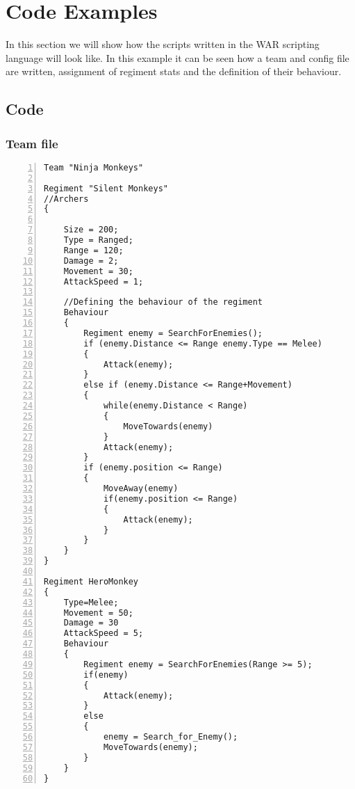 \section{Code Examples}
	In this section we will show how the scripts written in the WAR scripting language will look like.
	In this example it can be seen how a team and config file are written, assignment of regiment stats and the definition of their behaviour.
	\subsection{Code}
		\subsubsection{Team file}
					\begin{lstlisting}[basicstyle=\small\sffamily,
					keywords={break,case,const,continue,default,else,enum,
					for,if,return,switch,while,do,long,void,int,float,double,
					char,struct,typedef,include,size\_t},
					keywordstyle={\color{blue}},
					comment={[l]{//}}, morecomment={[s]{/*}{*/}}, commentstyle=\itshape,
					columns={[l]flexible}, numbers=left, numberstyle=\tiny,
					frameround=fftt, frame=shadowbox, captionpos=b,
					caption={Team file},
					label=LST:code31]
Team "Ninja Monkeys"

Regiment "Silent Monkeys"
//Archers
{
	
	Size = 200;
	Type = Ranged;
	Range = 120;
	Damage = 2;
	Movement = 30;
	AttackSpeed = 1;
	
	//Defining the behaviour of the regiment
	Behaviour
	{
		Regiment enemy = SearchForEnemies();
		if (enemy.Distance <= Range enemy.Type == Melee)
		{
			Attack(enemy);
		}
		else if (enemy.Distance <= Range+Movement)
		{
			while(enemy.Distance < Range)
			{
				MoveTowards(enemy)
			}
			Attack(enemy);
		}
		if (enemy.position <= Range)
		{
			MoveAway(enemy)
			if(enemy.position <= Range)
			{
				Attack(enemy);
			}
		}
	}
}

Regiment HeroMonkey
{
	Type=Melee;
	Movement = 50;
	Damage = 30
	AttackSpeed = 5;
	Behaviour
	{
		Regiment enemy = SearchForEnemies(Range >= 5);
		if(enemy)
		{
			Attack(enemy);
		}
		else
		{
			enemy = Search_for_Enemy();
			MoveTowards(enemy);
		}
	}
}
					\end{lstlisting}
